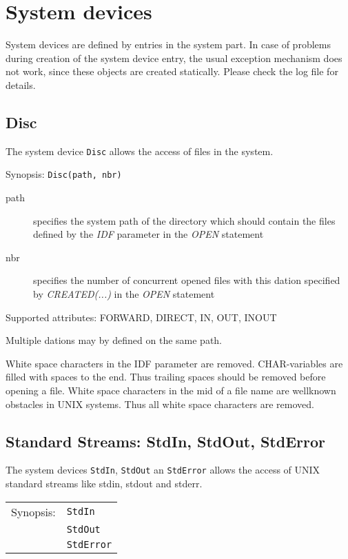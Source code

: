 \section{System devices}
\label{x8632devices}

System devices are defined by entries in the system part.
In case of problems during creation of the system device entry, the
usual exception mechanism does not work, since these objects are created
statically. Please check the log file for details.

\subsection{Disc}
The system device \verb|Disc| allows the access of files in the system.

Synopsis: \verb|Disc(path, nbr)|

\begin{description}
\item [path] specifies the system path of the directory which should contain
    the files defined by the {\em IDF} parameter in the {\em OPEN} statement
\item[nbr] specifies the number of concurrent opened files with this dation
     specified by {\em CREATED(...)} in the {\em OPEN} statement
\end{description}

Supported attributes: FORWARD, DIRECT, IN, OUT, INOUT

Multiple dations may by defined on the same path.

White space characters in the IDF parameter are removed.
CHAR-variables are filled with spaces to the end. Thus trailing spaces 
should be removed before opening a file.
White space characters in the mid of a file name are wellknown 
obstacles in UNIX systems. Thus all white space characters are removed.

\subsection{Standard Streams: StdIn, StdOut, StdError}
The system devices \verb|StdIn|,
\verb|StdOut| an \verb|StdError| allows the access of UNIX standard streams
like stdin, stdout and stderr.

\begin{tabular}{ll}
Synopsis: & \verb|StdIn| \\
          & \verb|StdOut| \\
          & \verb|StdError| \\
\end{tabular}

